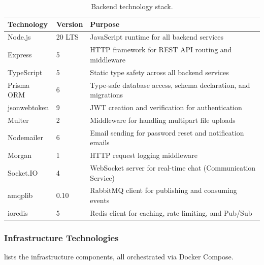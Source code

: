 \begin{table}[H]
  \centering
  \caption{Backend technology stack.}
  \label{tab:backend-stack}
  \small
  \begin{tabularx}{\textwidth}{@{} l l X @{}}
    \toprule
    \textbf{Technology} & \textbf{Version} & \textbf{Purpose} \\
    \midrule
    Node.js          & 20 LTS    & JavaScript runtime for all backend services \\
    Express          & 5         & HTTP framework for REST API routing and middleware \\
    TypeScript       & 5         & Static type safety across all backend services \\
    Prisma ORM       & 6         & Type-safe database access, schema declaration, and migrations \\
    jsonwebtoken     & 9         & JWT creation and verification for authentication \\
    Multer           & 2         & Middleware for handling multipart file uploads \\
    Nodemailer       & 6         & Email sending for password reset and notification emails \\
    Morgan           & 1         & HTTP request logging middleware \\
    Socket.IO        & 4         & WebSocket server for real-time chat (Communication Service) \\
    amqplib          & 0.10      & RabbitMQ client for publishing and consuming events \\
    ioredis          & 5         & Redis client for caching, rate limiting, and Pub/Sub \\
    \bottomrule
  \end{tabularx}
\end{table}

\subsubsection{Infrastructure Technologies}

 lists the infrastructure components, all orchestrated via Docker Compose.

